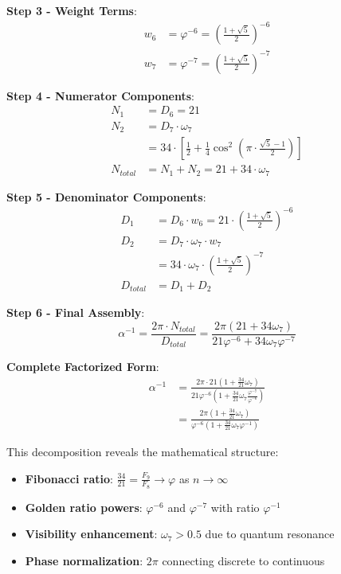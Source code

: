 \documentclass[%
 reprint,
 amsmath,amssymb,
 aps,
 prd,
 10pt,
 nofootinbib,      %
 longbibliography  %
]{revtex4-2}
\theoremstyle{definition}
\theoremstyle{remark}
\begin{document}
\textbf{Step 3 - Weight Terms}:
\begin{align}
w_6 &= \varphi^{-6} = \left(\frac{1+\sqrt{5}}{2}\right)^{-6} \\
w_7 &= \varphi^{-7} = \left(\frac{1+\sqrt{5}}{2}\right)^{-7}
\end{align}

\textbf{Step 4 - Numerator Components}:
\begin{align}
N_1 &= D_6 = 21 \\
N_2 &= D_7 \cdot \omega_7 \\
&= 34 \cdot \left[\frac{1}{2} + \frac{1}{4}\cos^2\left(\pi \cdot \frac{\sqrt{5}-1}{2}\right)\right] \\
N_{total} &= N_1 + N_2 = 21 + 34 \cdot \omega_7
\end{align}

\textbf{Step 5 - Denominator Components}:
\begin{align}
D_1 &= D_6 \cdot w_6 = 21 \cdot \left(\frac{1+\sqrt{5}}{2}\right)^{-6} \\
D_2 &= D_7 \cdot \omega_7 \cdot w_7 \\
&= 34 \cdot \omega_7 \cdot \left(\frac{1+\sqrt{5}}{2}\right)^{-7} \\
D_{total} &= D_1 + D_2
\end{align}

\textbf{Step 6 - Final Assembly}:
\begin{equation}
\boxed{
\alpha^{-1} = \frac{2\pi \cdot N_{total}}{D_{total}} = \frac{2\pi(21 + 34 \omega_7)}{21 \varphi^{-6} + 34 \omega_7 \varphi^{-7}}
}
\end{equation}

\textbf{Complete Factorized Form}:
\begin{align}
\alpha^{-1} &= \frac{2\pi \cdot 21(1 + \frac{34}{21}\omega_7)}{21 \varphi^{-6}(1 + \frac{34}{21}\omega_7 \frac{\varphi^{-7}}{\varphi^{-6}})} \\
&= \frac{2\pi(1 + \frac{34}{21}\omega_7)}{\varphi^{-6}(1 + \frac{34}{21}\omega_7 \varphi^{-1})}
\end{align}

This decomposition reveals the mathematical structure:
\begin{itemize}
\item \textbf{Fibonacci ratio}: $\frac{34}{21} = \frac{F_9}{F_8} \to \varphi$ as $n \to \infty$
\item \textbf{Golden ratio powers}: $\varphi^{-6}$ and $\varphi^{-7}$ with ratio $\varphi^{-1}$
\item \textbf{Visibility enhancement}: $\omega_7 > 0.5$ due to quantum resonance
\item \textbf{Phase normalization}: $2\pi$ connecting discrete to continuous
\end{itemize}
\end{document}
